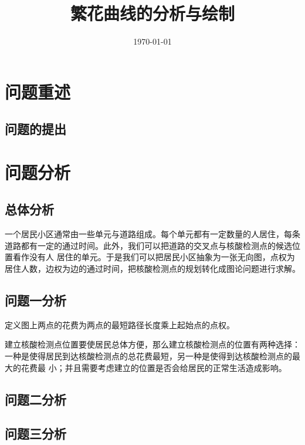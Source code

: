 \documentclass{cumcmthesis}
\title{繁花曲线的分析与绘制}
\date{\today}
\begin{document}
\maketitle

\begin{abstract}

\end{abstract}

\tableofcontents

\newpage
\section{问题重述}

\subsection{问题的提出}

\section{问题分析}

\subsection{总体分析}

一个居民小区通常由一些单元与道路组成。每个单元都有一定数量的人居住，每条道路都有一定的通过时间。此外，我们可以把道路的交叉点与核酸检测点的候选位置看作没有人
居住的单元。于是我们可以把居民小区抽象为一张无向图，点权为居住人数，边权为边的通过时间，把核酸检测点的规划转化成图论问题进行求解。

\subsection{问题一分析}

定义图上两点的花费为两点的最短路径长度乘上起始点的点权。

建立核酸检测点位置要使居民总体方便，那么建立核酸检测点的位置有两种选择：一种是使得居民到达核酸检测点的总花费最短，另一种是使得到达核酸检测点的最大的花费最
小；并且需要考虑建立的位置是否会给居民的正常生活造成影响。

\subsection{问题二分析}

\subsection{问题三分析}
\end{document}
